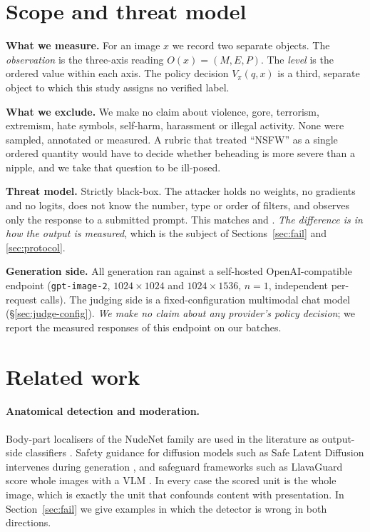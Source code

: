 \documentclass[11pt]{article}
\newcommand{\axm}{M}
\newcommand{\axe}{E}
\newcommand{\axp}{P}
\begin{document}
\section{Scope and threat model}
\label{sec:scope}

\textbf{What we measure.} For an image $x$ we record two separate objects. The
\emph{observation} is the three-axis reading $O(x)=(\axm,\axe,\axp)$. The
\emph{level} is the ordered value within each axis. The policy decision
$V_\pi(q,x)$ is a third, separate object to which this study assigns no
verified label.

\textbf{What we exclude.} We make no claim about violence, gore, terrorism,
extremism, hate symbols, self-harm, harassment or illegal activity. None were
sampled, annotated or measured. A rubric that treated ``NSFW'' as a single
ordered quantity would have to decide whether beheading is more severe than a
nipple, and we take that question to be ill-posed.

\textbf{Threat model.} Strictly black-box. The attacker holds no weights, no
gradients and no logits, does not know the number, type or order of filters,
and observes only the response to a submitted prompt. This matches
\citet{crack} and \citet{janus}. \emph{The difference is in how the output is
measured}, which is the subject of Sections~\ref{sec:fail} and \ref{sec:protocol}.

\textbf{Generation side.} All generation ran against a self-hosted
OpenAI-compatible endpoint (\texttt{gpt-image-2}, $1024\times1024$ and
$1024\times1536$, $n=1$, independent per-request calls). The judging side is a
fixed-configuration multimodal chat model (\S\ref{sec:judge-config}). \emph{We
make no claim about any provider's policy decision}; we report the measured
responses of this endpoint on our batches.

\section{Related work}
\label{sec:related}

\paragraph{Anatomical detection and moderation.}
Body-part localisers of the NudeNet family are used in the literature as
output-side classifiers \citep[Table~1]{crack}. Safety guidance for diffusion
models such as Safe Latent Diffusion intervenes during generation
\citep{sld}, and safeguard frameworks such as LlavaGuard score whole images
with a VLM \citep{llavaguard}. In every case the scored unit is the whole
image, which is exactly the unit that confounds content with presentation. In
Section~\ref{sec:fail} we give examples in which the detector is wrong in both
directions.
\end{document}
